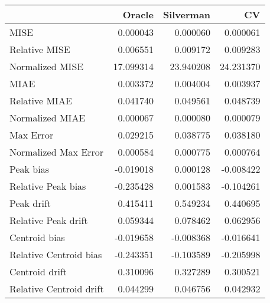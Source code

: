 \begin{tabular}{lrrr}
  \hline
 & Oracle & Silverman & CV \\ 
  \hline
MISE & 0.000043 & 0.000060 & 0.000061 \\ 
  Relative MISE & 0.006551 & 0.009172 & 0.009283 \\ 
  Normalized MISE & 17.099314 & 23.940208 & 24.231370 \\ 
  MIAE & 0.003372 & 0.004004 & 0.003937 \\ 
  Relative MIAE & 0.041740 & 0.049561 & 0.048739 \\ 
  Normalized MIAE & 0.000067 & 0.000080 & 0.000079 \\ 
  Max Error & 0.029215 & 0.038775 & 0.038180 \\ 
  Normalized Max Error & 0.000584 & 0.000775 & 0.000764 \\ 
  Peak bias & -0.019018 & 0.000128 & -0.008422 \\ 
  Relative Peak bias & -0.235428 & 0.001583 & -0.104261 \\ 
  Peak drift & 0.415411 & 0.549234 & 0.440695 \\ 
  Relative Peak drift & 0.059344 & 0.078462 & 0.062956 \\ 
  Centroid bias & -0.019658 & -0.008368 & -0.016641 \\ 
  Relative Centroid bias & -0.243351 & -0.103589 & -0.205998 \\ 
  Centroid drift & 0.310096 & 0.327289 & 0.300521 \\ 
  Relative Centroid drift & 0.044299 & 0.046756 & 0.042932 \\ 
   \hline
\end{tabular}
